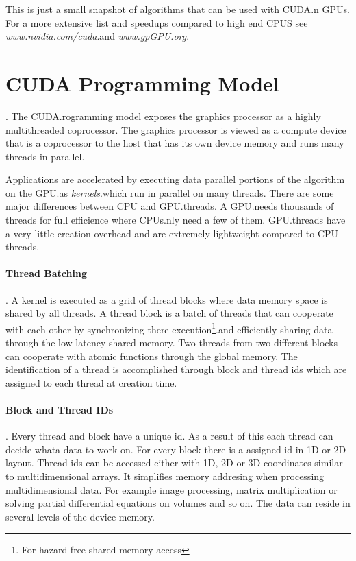 This is just a small snapshot of algorithms that can be used with  \gls{CUDA}.n GPUs.
For a more extensive list and speedups compared to high end CPUS see 
\emph{www.nvidia.com/cuda}.and \emph{www.gpGPU.org}.

\section{CUDA Programming Model}.%
\label{sub:cuda_programming_model} 
The \gls{CUDA}.rogramming model exposes the graphics processor as a highly
multithreaded coprocessor. The graphics processor is viewed as a compute device
that is a coprocessor to the host that has its own device memory and runs many
threads in parallel.

Applications are accelerated by executing data parallel portions of the
algorithm on the  \gls{GPU}.as \emph{kernels}.which run in parallel on
many threads. There are some major differences between CPU and  \gls{GPU}.threads. 
A  \gls{GPU}.needs thousands of threads for full efficience where \glspl{CPU}.nly need a few of
them.  \gls{GPU}.threads have a very little creation overhead and are extremely
lightweight compared to CPU threads.

\paragraph{Thread Batching}.%
\label{par:thread_batching} 
A kernel is executed as a grid of thread blocks where data memory space is
shared by all threads. A thread block is a batch of threads that can cooperate
with each other by synchronizing there execution\footnote{For hazard free shared
memory access}.and efficiently sharing data through the low latency shared
memory. Two threads from two different blocks can cooperate with atomic 
functions through the global memory. The identification of a thread is 
accomplished through block and thread ids which are assigned to each thread at 
creation time. 

\paragraph{Block and Thread IDs}.%
\label{par:block_and_thread_ids} 
Every thread and block have a unique id. As a result of this each thread can
decide whata data to work on. For every block there is a assigned id in 1D or 2D
layout. Thread ids can be accessed either with 1D, 2D or 3D coordinates similar
to multidimensional arrays. It simplifies memory addresing when processing
multidimensional data. For example image processing, matrix multiplication or
solving partial differential equations on volumes and so on. The data can reside
in several levels of the device memory. 

